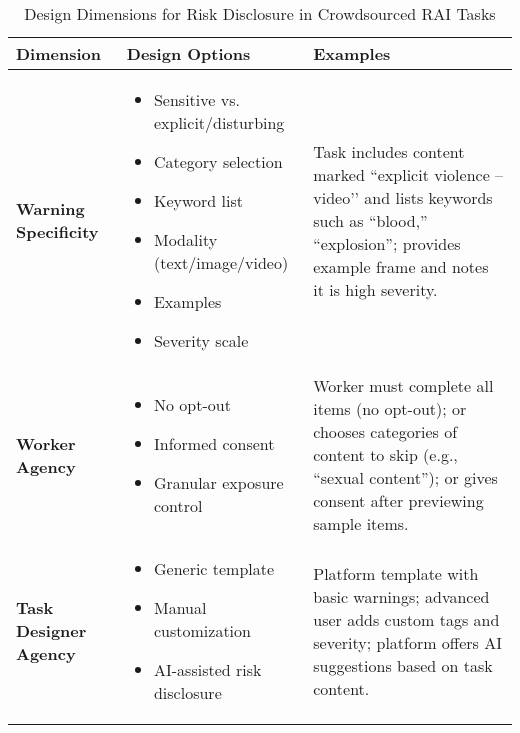 \begin{table*}[t]
\centering
\begin{tabular}{|p{3.2cm}p{5.6cm}p{5.5cm}|}
\toprule
\textbf{Dimension} & \textbf{Design Options} & \textbf{Examples} \\
\midrule
\textbf{Warning Specificity} &
\begin{itemize}[leftmargin=*]
  \item Sensitive vs. explicit/disturbing
  \item Category selection
  \item Keyword list
  \item Modality (text/image/video)
  \item Examples
  \item Severity scale
\end{itemize}
&
Task includes content marked ``explicit violence – video’’ and lists keywords such as “blood,” “explosion”; provides example frame and notes it is high severity. \\
\midrule
\textbf{Worker Agency} &
\begin{itemize}[leftmargin=*]
  \item No opt-out
  \item Informed consent
  \item Granular exposure control
\end{itemize}
&
Worker must complete all items (no opt-out); or chooses categories of content to skip (e.g., “sexual content”); or gives consent after previewing sample items. \\
\midrule
\textbf{Task Designer Agency} &
\begin{itemize}[leftmargin=*]
  \item Generic template
  \item Manual customization
  \item AI-assisted risk disclosure
\end{itemize}
&
Platform template with basic warnings; advanced user adds custom tags and severity; platform offers AI suggestions based on task content. \\
\bottomrule
\end{tabular}
\caption{Design Dimensions for Risk Disclosure in Crowdsourced RAI Tasks}
\label{tab:design_dimensions}
\end{table*}



